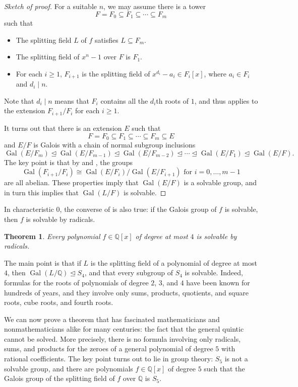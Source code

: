 \documentclass[12pt]{report}
\newtheorem{theorem}{Theorem}[chapter]
\numberwithin{equation}{section}
\numberwithin{theorem}{chapter}
\theoremstyle{definition}
\newtheorem*{basic properties}{Basic Properties}
\newtheorem*{Important Remark}{Important Remark}
\DeclareMathOperator{\Gal}{Gal}
\newcommand{\Q}{\mathbb{Q}}
\def\nsg{\unlhd}
\begin{document}
\begin{proof}[Sketch of proof]
For a suitable $n$, we may assume there is a tower
$$F = F_0 \subseteq F_1 \subseteq \cdots \subseteq F_m$$
such that 
\begin{itemize}
	\item The splitting field $L$ of $f$ satisfies $L \subseteq F_m$.
	\item The splitting field of $x^n -1$ over $F$ is $F_1$.
	\item For each $i \geqslant 1$, $F_{i+1}$ is the splitting field of $x^{d_i} - a_i \in F_i[x]$, where $a_i \in F_i$ and $d_i \mid n$.  
\end{itemize}

Note that $d_i \mid n$ means that $F_i$ contains all the $d_i$th roots of $1$, and thus  applies to the extension $F_{i+1}/F_i$ for each $i \geqslant 1$.

It turns out that there is an extension $E$ such that 
$$F = F_0 \subseteq F_1 \subseteq \cdots \subseteq F_m \subseteq E$$
and $E/F$ is Galois with a chain of normal subgroup inclusions
$$\Gal(E/F_m) \nsg \Gal(E/F_{m-1}) \nsg \Gal(E/F_{m-2}) \nsg \cdots \nsg\Gal(E/F_{1}) \nsg \Gal(E/F).$$
The key point is that by  and , the groups 
$$\Gal(F_{i+1}/F_i)\cong\Gal(E/F_i)/\Gal(E/F_{i+1}) \text{ for } i = 0, \dots, m-1$$ 
are all abelian. These properties imply that $\Gal(E/F)$ is a solvable group, and in turn this implies that $\Gal(L/F)$ is solvable.
\end{proof}

In characteristic $0$, the converse of  is also true: if the Galois group of $f$ is solvable, then $f$ is solvable by radicals. 

\begin{theorem}
	Every polynomial $f \in \Q[x]$ of degree at most $4$ is solvable by radicals.
\end{theorem}


The main point is that if $L$ is the splitting field of a polynomial of degree at most $4$, then $\Gal(L/\Q) \nsg S_4$, and that every subgroup of $S_4$ is solvable. Indeed, formulas for the roots of polynomials of degree $2$, $3$, and $4$ have been known for hundreds of years, and they involve only sums, products, quotients, and square roots, cube roots, and fourth roots.


We can now prove a theorem that has fascinated mathematicians and nonmathematicians alike for many centuries: the fact that the general quintic cannot be solved. More precisely, there is no formula involving  only radicals, sums, and products for the zeroes of a general polynomial of degree $5$ with rational coefficients. The key point turns out to lie in group theory: $S_5$ is not a solvable group, and there are polynomials $f \in \Q[x]$ of degree $5$ such that the Galois group of the splitting field of $f$ over $\Q$ is $S_5$.
\end{document}
